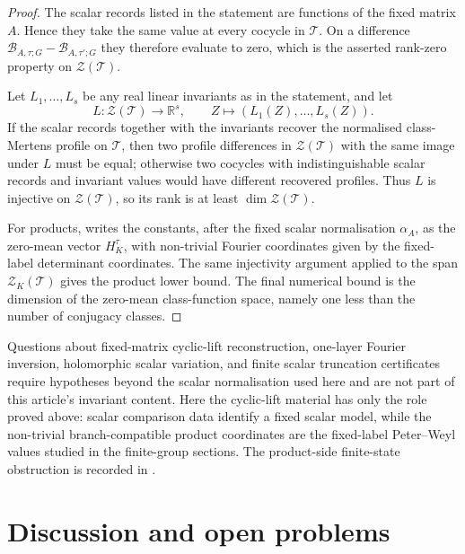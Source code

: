 \documentclass[11pt,a4paper]{amsart}
\theoremstyle{plain}
\theoremstyle{definition}
\theoremstyle{remark}
\begin{document}
\begin{proof}
  The scalar records listed in the statement are functions of the fixed matrix
  \(A\).  Hence they take the same value at every cocycle in \(\mathscr T\).
  On a difference
  \(\mathcal B_{A,\tau;G}-\mathcal B_{A,\tau';G}\) they therefore evaluate to
  zero, which is the asserted rank-zero property on
  \(\mathcal Z(\mathscr T)\).

  Let \(L_1,\dots,L_s\) be any real linear invariants as in the statement,
  and let
  \[
    L:\mathcal Z(\mathscr T)\longrightarrow\mathbb R^s,
    \qquad Z\longmapsto(L_1(Z),\dots,L_s(Z)).
  \]
  If the scalar records together with the invariants recover the normalised
  class-Mertens profile on \(\mathscr T\), then two profile differences in
  \(\mathcal Z(\mathscr T)\) with the same image under \(L\) must be equal;
  otherwise two cocycles with indistinguishable scalar records and invariant
  values would have different recovered profiles.  Thus \(L\) is injective on
  \(\mathcal Z(\mathscr T)\), so its rank is at least
  \(\dim\mathcal Z(\mathscr T)\).

  For products,  writes the
  constants, after the fixed scalar normalisation \(\alpha_A\), as the
  zero-mean vector \(H_K^\tau\), with non-trivial Fourier coordinates given by
  the fixed-label determinant coordinates.  The same injectivity argument
  applied to the span \(\mathcal Z_K(\mathscr T)\) gives the product lower
  bound.  The final numerical bound is the dimension of the zero-mean
  class-function space, namely one less than the number of conjugacy classes.
\end{proof}

\noindent
Questions about fixed-matrix cyclic-lift reconstruction, one-layer Fourier
inversion, holomorphic scalar variation, and finite scalar truncation
certificates require hypotheses beyond the scalar normalisation used here and
are not part of this article's invariant content.  Here the cyclic-lift material
has only the role proved above: scalar comparison data identify a fixed scalar
model, while the non-trivial
branch-compatible product coordinates are the fixed-label Peter--Weyl values
studied in the finite-group sections.  The
product-side finite-state obstruction is recorded in
.


\section{Discussion and open problems}\label{sec:conclusion}
\end{document}
